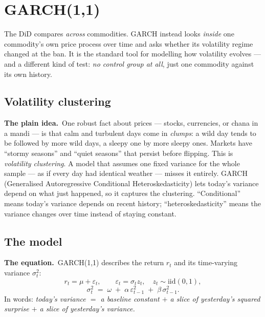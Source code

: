 \documentclass[11pt]{article}
\newcommand{\intuit}{\smallskip\noindent\textbf{The plain idea.}\ }
\newcommand{\formula}{\smallskip\noindent\textbf{The equation.}\ }
\begin{document}
\section{GARCH(1,1)}

The DiD compares \emph{across} commodities. GARCH instead looks \emph{inside} one commodity's own
price process over time and asks whether its volatility regime changed at the ban. It is the
standard tool for modelling how volatility evolves --- and a different kind of test: \emph{no control
group at all}, just one commodity against its own history.

\subsection{Volatility clustering}

\intuit One robust fact about prices --- stocks, currencies, or chana in a mandi --- is that calm
and turbulent days come in \emph{clumps}: a wild day tends to be followed by more wild days, a
sleepy one by more sleepy ones. Markets have ``stormy seasons'' and ``quiet seasons'' that persist
before flipping. This is \emph{volatility clustering}. A model that assumes one fixed variance for
the whole sample --- as if every day had identical weather --- misses it entirely. GARCH
(Generalised Autoregressive Conditional Heteroskedasticity) lets today's variance depend on what
just happened, so it captures the clustering. ``Conditional'' means today's variance depends on
recent history; ``heteroskedasticity'' means the variance changes over time instead of staying
constant.

\subsection{The model}

\formula GARCH(1,1) describes the return $r_t$ and its time-varying variance $\sigma_t^2$:
\[
r_t = \mu + \varepsilon_t,\qquad \varepsilon_t = \sigma_t z_t,\quad z_t \sim \text{iid}(0,1),
\]
\[
\sigma_t^2 \;=\; \omega \;+\; \alpha\,\varepsilon_{t-1}^2 \;+\; \beta\,\sigma_{t-1}^2.
\]
In words: \emph{today's variance $=$ a baseline constant $+$ a slice of yesterday's squared
surprise $+$ a slice of yesterday's variance.}
\end{document}
